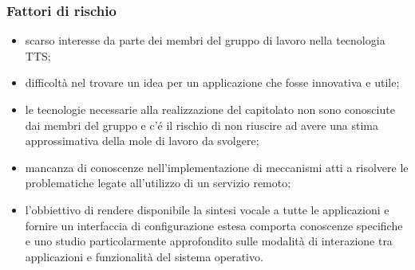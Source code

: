 \documentclass[12pt,a4paper]{article}
\begin{document}
\subsubsection{Fattori di rischio}
\begin{itemize}
\item scarso interesse da parte dei membri del gruppo di lavoro nella tecnologia TTS;
\item difficoltà nel trovare un idea per un applicazione che fosse innovativa e utile;
\item le tecnologie necessarie alla realizzazione del capitolato non sono conosciute dai membri del gruppo e c'é il rischio di non riuscire ad avere una stima approssimativa della mole di lavoro da svolgere;
\item mancanza di conoscenze nell'implementazione di meccanismi atti a risolvere le problematiche legate all'utilizzo di un servizio remoto;
\item l'obbiettivo di rendere disponibile la sintesi vocale a tutte le applicazioni e fornire un interfaccia di configurazione estesa comporta conoscenze specifiche e uno studio particolarmente approfondito sulle modalità di interazione tra applicazioni e funzionalità del sistema operativo.
\end{itemize}

\newpage
\printglossary[title={Glossario}]
\end{document}
